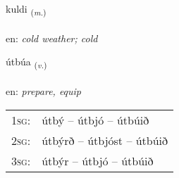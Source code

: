 \documentclass[frontgrid, backgrid]{flacards}\usepackage[]{graphicx}\usepackage[]{xcolor}
\begin{document}
\renewcommand{\blhead}{\vskip5pt {\small\bfseries\footnotesize Nafnorð | Noun }}
\renewcommand{\bcfoot}{\vskip5pt \hspace{2pt}{\small\bfseries\footnotesize 3K}}


{kuldi \small{\textsubscript{(\textit{m.})}} \\[1ex] %
\textphonetic{[kʰʏltɪ]} \\
en: \emph{cold weather; cold} \\  [2ex]
\renewcommand*{\arraystretch}{0.8}
}

\renewcommand{\flhead}{\vskip5pt \fboxsep=0pt {\small\bfseries\footnotesize Sagnorð | Verb}}
\renewcommand{\fcfoot}{\vskip5pt \fboxsep=0pt \hspace{2pt}{\small\bfseries\footnotesize 3K}}

\renewcommand{\blhead}{\vskip5pt {\small\bfseries\footnotesize Sagnorð | Verb }}
\renewcommand{\bcfoot}{\vskip5pt \hspace{2pt}{\small\bfseries\footnotesize 3K}}


{útbúa \small{\textsubscript{(\textit{v.})}} \\[1ex] %
\textphonetic{[uːtpua]} \\
en: \emph{prepare, equip} \\  [2ex]
\renewcommand*{\arraystretch}{0.8}
\begin{tabular}{p{1cm}l}
\textsc{1sg}: & útbý -- útbjó -- útbúið \\ 
\textsc{2sg}: & útbýrð -- útbjóst -- útbúið \\ 
\textsc{3sg}: & útbýr -- útbjó -- útbúið \\ 
\end{tabular}
}

\renewcommand{\flhead}{\vskip5pt \fboxsep=0pt {\small\bfseries\footnotesize Nafnorð | Noun}}
\renewcommand{\fcfoot}{\vskip5pt \fboxsep=0pt \hspace{2pt}{\small\bfseries\footnotesize 3K}}
\end{document}
